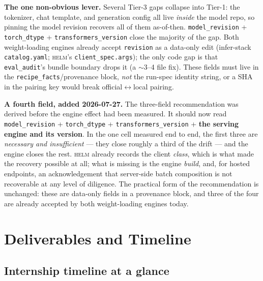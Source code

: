 \documentclass[11pt]{report}
\newcommand{\code}[1]{\texttt{#1}}
\begin{document}
\noindent\textbf{The one non-obvious lever.} Several Tier-3 gaps collapse into
Tier-1: the tokenizer, chat template, and generation config all live \emph{inside}
the model repo, so pinning the model revision recovers all of them as-of-then.
\code{model\_revision} + \code{torch\_dtype} + \code{transformers\_version} close
the majority of the gap. Both weight-loading engines already accept \code{revision}
as a data-only edit (infer-stack \code{catalog.yaml}; \textsc{helm}'s
\code{client\_spec.args}); the only code gap is that \code{eval\_audit}'s bundle
boundary drops it (a $\sim$3--4 file fix). These fields must live in the
\code{recipe\_facts}/provenance block, \emph{not} the run-spec identity string, or a
SHA in the pairing key would break official$\leftrightarrow$local pairing.

\noindent\textbf{A fourth field, added 2026-07-27.} The three-field recommendation
was derived before the engine effect had been measured. It should now read
\code{model\_revision} + \code{torch\_dtype} + \code{transformers\_version} +
\textbf{the serving engine and its version}. In the one cell measured end to end,
the first three are \emph{necessary and insufficient} --- they close roughly a third
of the drift --- and the engine closes the rest. \textsc{helm} already records the
client \emph{class}, which is what made the recovery possible at all; what is missing
is the engine \emph{build}, and, for hosted endpoints, an acknowledgement that
server-side batch composition is not recoverable at any level of diligence. The
practical form of the recommendation is unchanged: these are data-only fields in a
provenance block, and three of the four are already accepted by both weight-loading
engines today.

\chapter{Deliverables and Timeline}
\label{app:deliverables}

\section{Internship timeline at a glance}
\end{document}
